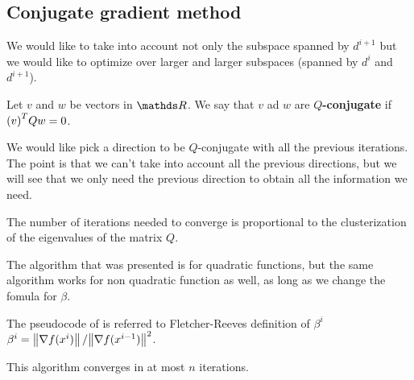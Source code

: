 \documentclass[computationalMathematics.tex]{subfiles}
\begin{document}
\subsection{Conjugate gradient method}



We would like to take into account not only the subspace spanned by $d^{i+1}$ but we would like to optimize over larger and larger subspaces (spanned by $d^i$ and $d^{i+1}$).

\begin{definition}[Q-conjugate]
Let $v$ and $w$ be vectors in $\R$. We say that $v$ ad $w$ are \textbf{$Q$-conjugate} if ${(v)}^{T} Q w = 0$.
\end{definition}

We would like pick a direction to be $Q$-conjugate with all the previous iterations. The point is that we can't take into account all the previous directions, but we will see that we only need the previous direction to obtain all the information we need.


The number of iterations needed to converge is proportional to the clusterization of the eigenvalues of the matrix $Q$.

The algorithm that was presented is for quadratic functions, but the same algorithm works for non quadratic function as well, as long as we change the fomula for $\beta$.

The pseudocode of  is referred to Fletcher-Reeves definition of $\beta^i$ $\beta^i = \left\lVert\nabla f(x^i)\right\rVert / {\left\lVert\nabla f(x^{i-1})\right\rVert}^2$.

This algorithm converges in at most $n$ iterations.
\end{document}
